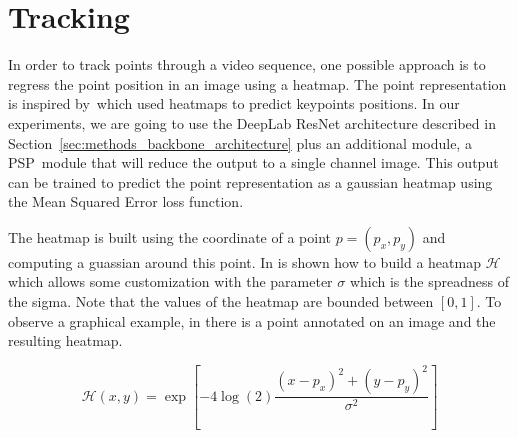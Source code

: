 \section{Tracking}
\label{sec:methods_tracking}

In order to track points through a video sequence, one possible approach is to regress the point position in an image using a heatmap.
The point representation is inspired by~\hourglass which used heatmaps to predict keypoints positions.
In our experiments, we are going to use the DeepLab ResNet architecture described in Section~\ref{sec:methods_backbone_architecture} plus an additional module, a PSP~\pspnet module that will reduce the output to a single channel image.
This output can be trained to predict the point representation as a gaussian heatmap %
using the Mean Squared Error loss function.

The heatmap is built using the coordinate of a point $p = (p_x, p_y)$ and computing a guassian around this point.
In  is shown how to build a heatmap $\mathcal{H}$ which allows some customization with the parameter $\sigma$ which is the spreadness of the sigma.
Note that the values of the heatmap are bounded between $[0, 1]$.
To observe a graphical example, in  there is a point annotated on an image and the resulting heatmap.

\begin{equation}
  \mathcal{H}(x, y) = \exp \left[ -4 \log(2) \frac{ (x - p_x)^2 + (y - p_y)^2 }{ \sigma^2 } \right]
  \label{eq:heatmap}
\end{equation}

